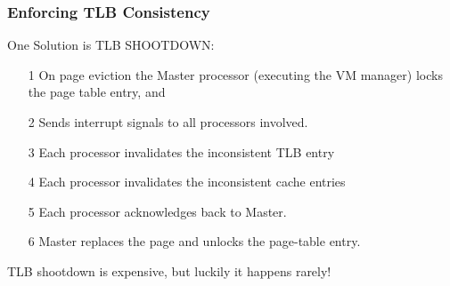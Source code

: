 \documentclass{beamer}
\renewcommand{\emph}[1]{\textcolor{structure}{#1}}
\newcommand{\emp}[1]{\textcolor{DikuRed}{ #1}}
\begin{document}
\begin{frame}[fragile,t]
\frametitle{Enforcing TLB Consistency}
\bigskip

One Solution is \emp{TLB SHOOTDOWN}:
\begin{itemize} 
    \item[1] On page eviction the Master processor (executing the VM manager)
                locks the page table entry, and
    \item[2] Sends interrupt signals to all processors involved. 
    \item[3] Each processor invalidates the inconsistent TLB entry
    \item[4] Each processor invalidates the inconsistent cache entries
    \item[5] Each processor acknowledges back to Master.
    \item[6] Master replaces the page and unlocks the page-table entry.
\end{itemize} 

\bigskip
\alert{TLB shootdown is expensive}, \emph{but luckily it happens rarely!}

\end{frame}
\end{document}
